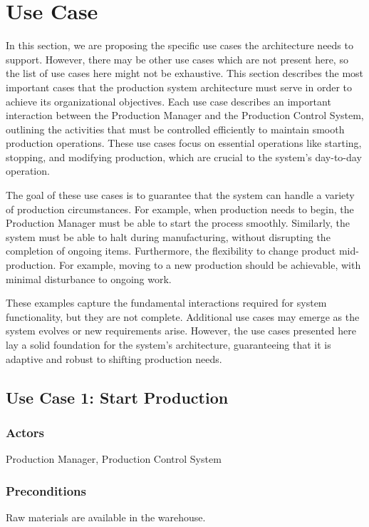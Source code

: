 \section{Use Case}
\label{sec:use_case}
In this section, we are proposing the specific use cases the architecture needs to support. However, there may be other use cases which are not present here, so the list of use cases here might not be exhaustive. This section describes the most important cases that the production system architecture must serve in order to achieve its organizational objectives. Each use case describes an important interaction between the Production Manager and the Production Control System, outlining the activities that must be controlled efficiently to maintain smooth production operations. These use cases focus on essential operations like starting, stopping, and modifying production, which are crucial to the system's day-to-day operation.

The goal of these use cases is to guarantee that the system can handle a variety of production circumstances. For example, when production needs to begin, the Production Manager must be able to start the process smoothly. Similarly, the system must be able to halt during manufacturing, without disrupting the completion of ongoing items. Furthermore, the flexibility to change product mid-production. For example, moving to a new production should be achievable, with minimal disturbance to ongoing work.

These examples capture the fundamental interactions required for system functionality, but they are not complete. Additional use cases may emerge as the system evolves or new requirements arise. However, the use cases presented here lay a solid foundation for the system's architecture, guaranteeing that it is adaptive and robust to shifting production needs.


\subsection{Use Case 1: Start Production}

\subsubsection{Actors}
Production Manager, Production Control System

\subsubsection{Preconditions}
Raw materials are available in the warehouse.

